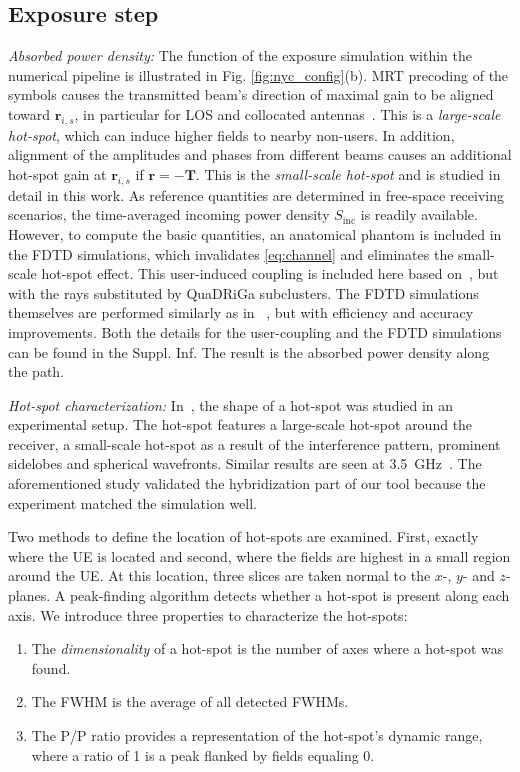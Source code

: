 \documentclass{IEEEtran}
\begin{document}
\subsection{Exposure step}
\label{sec:exposure}
\textit{Absorbed power density:} The function of the exposure simulation within the numerical pipeline is illustrated in Fig. \ref{fig:nyc_config}(b). \gls{MRT} precoding of the symbols causes the transmitted beam's direction of maximal gain to be aligned toward $\mathbf{r}_{i,s}$, in particular for \gls{LOS} and collocated antennas~\cite{RT/FDTD2}. This is a \textit{large-scale hot-spot}, which can induce higher fields to nearby non-users. In addition, alignment of the amplitudes and phases from different beams causes an additional hot-spot gain at $\mathbf{r}_{i,s}$ if $\mathbf{r} = -\mathbf{T}$. This is the \textit{small-scale hot-spot} and is studied in detail in this work. As reference quantities are determined in free-space receiving scenarios, the time-averaged incoming power density $S_\mathrm{inc}$ is readily available. However, to compute the basic quantities, an anatomical phantom is included in the FDTD simulations, which invalidates \eqref{eq:channel} and eliminates the small-scale hot-spot effect. This user-induced coupling is included here based on~\cite{RT/FDTD_coupling}, but with the rays substituted by \gls{QuaDRiGa} subclusters. The FDTD simulations themselves are performed similarly as in ~\cite{RT/FDTD2}, but with efficiency and accuracy improvements. Both the details for the user-coupling and the FDTD simulations can be found in the Suppl. Inf. The result is the absorbed power density along the path.

\textit{Hot-spot characterization:} In~\cite{hotspots_eucap}, the shape of a hot-spot was studied in an experimental setup. The hot-spot features a large-scale hot-spot around the receiver, a small-scale hot-spot as a result of the interference pattern, prominent sidelobes and spherical wavefronts. Similar results are seen at 3.5~GHz~\cite{hotspots_art}. The aforementioned study validated the hybridization part of our tool because the experiment matched the simulation well. 

Two methods to define the location of hot-spots are examined. First, exactly where the \gls{UE} is located and second, where the fields are highest in a small region around the \gls{UE}. At this location, three slices are taken normal to the $x$-, $y$- and $z$-planes. A peak-finding algorithm detects whether a hot-spot is present along each axis. We introduce three properties to characterize the hot-spots:
\begin{enumerate}
    \item The \textit{dimensionality} of a hot-spot is the number of axes where a hot-spot was found. 
    \item The \gls{FWHM} is the average of all detected \glspl{FWHM}. 
    \item The \gls{P/P} ratio provides a representation of the hot-spot’s dynamic range, where a ratio of 1 is a peak flanked by fields equaling 0. 
\end{enumerate}
\end{document}
